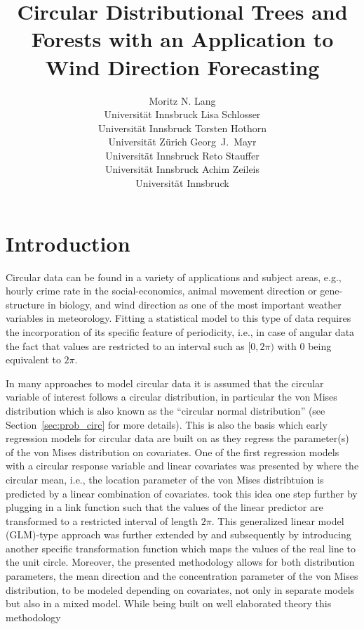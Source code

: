 \documentclass[nojss]{jss}
\title{Circular Distributional Trees and Forests with an Application to 
    Wind Direction Forecasting}
\author{Moritz N. Lang\\Universit\"at Innsbruck
   \And Lisa Schlosser\\Universit\"at Innsbruck
   \And Torsten Hothorn\\Universit\"at Z\"urich
   \AND Georg~J.~Mayr\\Universit\"at Innsbruck
   \And Reto Stauffer\\Universit\"at Innsbruck
   \And Achim Zeileis\\Universit\"at Innsbruck}
\numberwithin{equation}{section}
\begin{document}
\section{Introduction}
\label{sec:introduction}

Circular data can be found in a variety of applications and subject areas, 
e.g., hourly crime rate in the social-economics, animal movement direction or 
gene-structure in biology, and wind direction as one of the most important weather 
variables in meteorology. Fitting a statistical model to this type of data requires
the incorporation of its specific feature of periodicity, i.e., in case of angular
data the fact that values are restricted to an interval such as $[0,2\pi)$ with
$0$ being equivalent to $2\pi$.

In many approaches to model circular data it is assumed that the circular variable of interest 
follows a circular distribution, in particular the von Mises distribution which is also known 
as the ``circular normal distribution'' (see Section~\ref{sec:prob_circ} for more details). 
This is also the basis which early regression models for circular data are built on as they 
regress the parameter(s) of the von Mises distribution on covariates.
One of the first regression models with a circular response variable and linear covariates
was presented by \cite{Gould:1969} where the circular mean, i.e., the location parameter of 
the von Mises distribtuion is predicted by a linear combination of covariates.
\cite{Johnson+Wehrly:1978} took this idea one step further by plugging in a link function such that the values of the 
linear predictor are transformed to a restricted interval of length $2\pi$. 
This generalized linear model (GLM)-type approach was further extended by \cite{Fisher+Lee:1992} and subsequently by \cite{Fisher:1993} 
introducing another specific transformation function which maps the values of the real line to the 
unit circle. Moreover, the presented methodology allows for both distribution parameters, the mean direction and the concentration parameter of the von Mises distribution, to be modeled depending
on covariates, not only in separate models but also in a mixed model. 
While being built on well elaborated theory this methodology 
\end{document}
